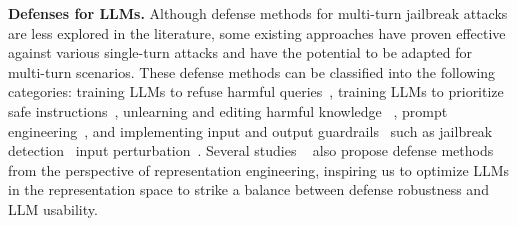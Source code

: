 \textbf{Defenses for LLMs.} 
Although defense methods for multi-turn jailbreak attacks are less explored in the literature, some existing approaches have proven effective against various single-turn attacks and have the potential to be adapted for multi-turn scenarios. 
These defense methods can be classified into the following categories: training LLMs to refuse harmful queries~\citep{bai2022training, dpo, ouyang2022training, decoupled_sft}, training LLMs to prioritize safe instructions~\citep{lu2024sofa,wallace2024instruction,zhang2023defending}, unlearning and editing harmful knowledge ~\citep{eraser, safe_unlearning, ren2024identifying, cq}, prompt engineering~\citep{xie2023defending, zheng2024prompt}, and implementing input and output guardrails~\citep{ inan2023llama,dubey2024llama} such as jailbreak detection~\citep{hu2024gradient, jain2023baseline} input perturbation~\citep{cao2023defending,robey2023smoothllm,liu2024protecting}. %
%
Several studies ~\citep{li2024wmdp,circuit_breaker,zou2023representation, qian2024towards, zhang2024better} also propose defense methods from the perspective of representation engineering, inspiring us to optimize LLMs in the representation space to strike a balance between defense robustness and LLM usability.

